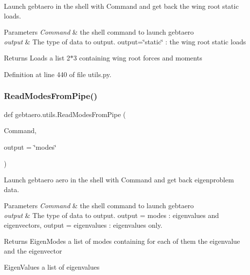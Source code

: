 Launch gebtaero in the shell with Command and get back the wing root static loads. 


\begin{DoxyParams}{Parameters}
{\em Command} & the shell command to launch gebtaero \\
\hline
{\em output} & The type of data to output. output=\char`\"{}static\char`\"{} \+: the wing root static loads \\
\hline
\end{DoxyParams}
\begin{DoxyReturn}{Returns}
Loads a list 2$\ast$3 containing wing root forces and moments 
\end{DoxyReturn}


Definition at line 440 of file utils.\+py.

\mbox{\label{namespacegebtaero_1_1utils_a79bf2fa9cdad677abf70cacde7abcf9e}} 
\subsubsection{\texorpdfstring{Read\+Modes\+From\+Pipe()}{ReadModesFromPipe()}}
{\footnotesize\ttfamily def gebtaero.\+utils.\+Read\+Modes\+From\+Pipe (\begin{DoxyParamCaption}\item[{}]{Command,  }\item[{}]{output = {\ttfamily \char`\"{}modes\char`\"{}} }\end{DoxyParamCaption})}



Launch gebtaero aero in the shell with Command and get back eigenproblem data. 


\begin{DoxyParams}{Parameters}
{\em Command} & the shell command to launch gebtaero \\
\hline
{\em output} & The type of data to output. output = modes \+: eigenvalues and eigenvectors, output = eigenvalues \+: eigenvalues only. \\
\hline
\end{DoxyParams}
\begin{DoxyReturn}{Returns}
Eigen\+Modes a list of modes containing for each of them the eigenvalue and the eigenvector 

Eigen\+Values a list of eigenvalues 
\end{DoxyReturn}


